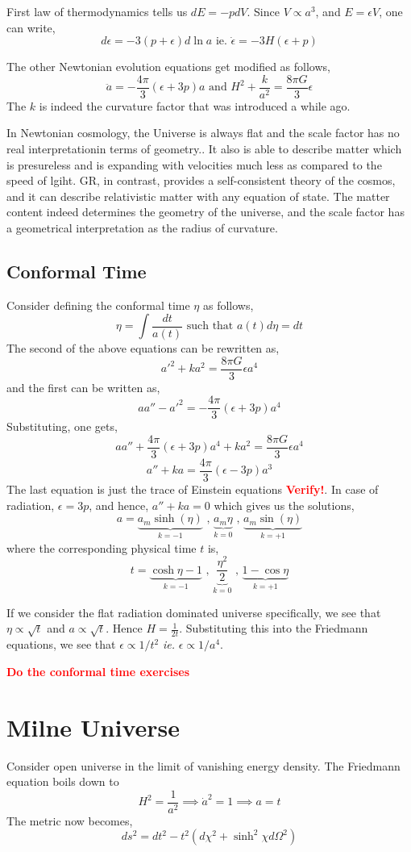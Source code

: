 \documentclass[a4paper,11pt]{article}
\newcommand{\bes}{\begin{equation*}}
\newcommand{\ees}{\end{equation*}}
\begin{document}
First law of thermodynamics tells us $dE = -pdV$. Since $V \propto a^3$, and $E = \epsilon V$, one can write,
$$d \epsilon = -3 (p+\epsilon) d\ln a \text{ ie. } \dot{\epsilon} = -3H(\epsilon + p)$$

The other Newtonian evolution equations get modified as follows, 
$$\ddot{a} = -\frac{4 \pi}{3}(\epsilon + 3p)a \text{ and } H^2 + \frac{k}{a^2} = \frac{8 \pi G}{3}\epsilon$$ 
The $k$ is indeed the curvature factor that was introduced a while ago.

In Newtonian cosmology, the Universe is always flat and the scale factor has no real interpretationin terms of geometry.. It also is able to describe matter which is presureless and is expanding with velocities much less as compared to the speed of lgiht. GR, in contrast, provides a self-consistent theory of the cosmos, and it can describe relativistic matter with any equation of state. The matter content indeed determines the geometry of the universe, and the scale factor has a geometrical interpretation as the radius of curvature.

\subsection{Conformal Time}
Consider defining the conformal time $\eta$ as follows,
$$\eta = \int \frac{dt}{a(t)} \text{ such that } a(t)d\eta = dt$$
The second of the above equations can be rewritten as,
$$ a'^2 + k a^2 = \frac{8\pi G}{3}\epsilon a^4$$  and the first can be written as,
$$a a'' -a'^2 = -\frac{4 \pi}{3}(\epsilon + 3p)a^4$$
Substituting, one gets,
$$a a'' + \frac{4 \pi}{3}(\epsilon + 3p)a^4 + k a^2 = \frac{8\pi G}{3}\epsilon a^4$$
$$a'' + k a = \frac{4 \pi}{3}(\epsilon - 3p)a^3 $$
The last equation is just the trace of Einstein equations \textbf{\textcolor{red}{Verify!}}. In case of radiation, $\epsilon = 3p$, and hence, $a'' + ka = 0$ which gives us the solutions,
$$a = \underbrace{a_m \sinh(\eta)}_{k=-1} \text{ , }\underbrace{a_m \eta}_{k=0} \text{ , } \underbrace{a_m \sin(\eta)}_{k=+1} $$ where the corresponding physical time $t$ is,
$$t = \underbrace{\cosh \eta - 1}_{k=-1} \text{ , }\underbrace{\frac{\eta^2}{2}}_{k=0} \text{ , } \underbrace{1 - \cos \eta}_{k=+1} $$

If we consider the flat radiation dominated universe specifically, we see that $\eta \propto \sqrt{t}$ and $a \propto \sqrt{t}$. Hence $H = \frac{1}{2t}$. Substituting this into the Friedmann equations, we see that $\epsilon \propto 1/t^2$ \textit{ie.} $\epsilon \propto 1/a^4$.

\textbf{\textcolor{red}{Do the conformal time exercises}}

\section{Milne Universe}
Consider open universe in the limit of vanishing energy density. The Friedmann equation boils down to $$ H^2  = \frac{1}{a^2} \implies \dot{a}^2 = 1 \implies a=t$$
The metric now becomes,
\bes
ds^2 = dt^2 -t^2 (d \chi^2 + \sinh^2 \chi d\Omega^2)
\ees
\end{document}
